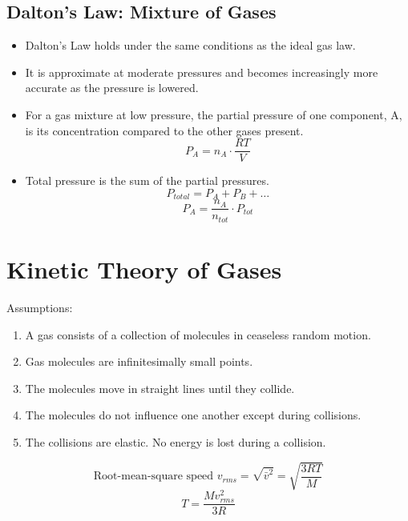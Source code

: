\documentclass[10pt]{article}
\begin{document}
\subsection*{Dalton's Law: Mixture of Gases}
\begin{itemize}
    \item Dalton's Law holds under the same conditions as the ideal gas law.
    \item It is approximate at moderate pressures and becomes increasingly more accurate as the pressure is lowered.
    \item For a gas mixture at low pressure, the partial pressure of one component, A, is its concentration compared to the other gases present.
    \[P_A = n_A \cdot \frac{RT}{V}\]
    \item Total pressure is the sum of the partial pressures.
    \[P_{total} = P_A + P_B + \dots\]
    \[P_A = \frac{n_A}{n_{tot}} \cdot P_{tot}\]
\end{itemize}

\section*{Kinetic Theory of Gases}
Assumptions: 
\begin{enumerate}
    \item A gas consists of a collection of molecules in ceaseless random motion.
    \item Gas molecules are infinitesimally small points.
    \item The molecules move in straight lines until they collide.
    \item The molecules do not influence one another except during collisions.
    \item The collisions are elastic.  No energy is lost during a collision.
\end{enumerate}

\[\text{Root-mean-square speed }v_{rms} = \sqrt{\bar v^2} = \sqrt{\frac{3RT}{M}}\]
\[T = \frac{Mv^2_{rms}}{3R}\]
\end{document}
